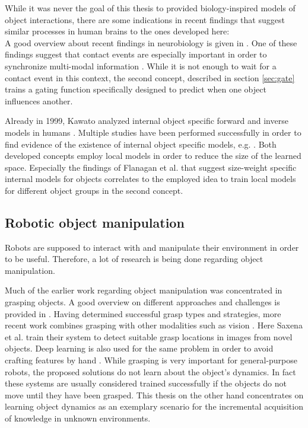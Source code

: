 While it was never the goal of this thesis to provided biology-inspired models of object interactions, there are some indications in recent findings that suggest similar processes in human brains to the ones developed here: \\
A good overview about recent findings in neurobiology is given in \cite{flanagan2006control}. One of these findings suggest that contact events are especially important in order to synchronize multi-modal information \cite{johansson2001eye}. 
While it is not enough to wait for a contact event in this context, the second concept, described in section \ref{sec:gate} trains a gating function specifically designed to predict when one object influences another.

Already in 1999, Kawato analyzed internal object specific forward and inverse models in humans \cite{kawato1999internal}. Multiple studies have been performed successfully in order to find evidence of the existence of internal object specific models, e.g. \cite{flanagan2001sensorimotor, merfeld1999humans}.
Both developed concepts employ local models in order to reduce the size of the learned space. Especially the findings of Flanagan et al. \cite{flanagan2001sensorimotor} that suggest size-weight specific internal models for objects correlates to the employed idea to train local models for different object groups in the second concept.

\subsection{Robotic object manipulation}

Robots are supposed to interact with and manipulate their environment in order to be useful. Therefore, a lot of research is being done regarding object manipulation.

Much of the earlier work regarding object manipulation was concentrated in grasping objects. A good overview on different approaches and challenges is provided in \cite{graspingReview}. Having determined successful grasp types and strategies, more recent work combines grasping with other modalities such as vision \cite{graspingVision}. Here Saxena et al. train their system to detect suitable grasp locations in images from novel objects.
Deep learning is also used for the same problem in order to avoid crafting features by hand \cite{graspingDeep}. 
While grasping is very important for general-purpose robots, the proposed solutions do not learn about the object's dynamics. In fact these systems are usually considered trained successfully if the objects do not move until they have been grasped. 
This thesis on the other hand concentrates on learning object dynamics as an exemplary scenario for the incremental acquisition of knowledge in unknown environments.

